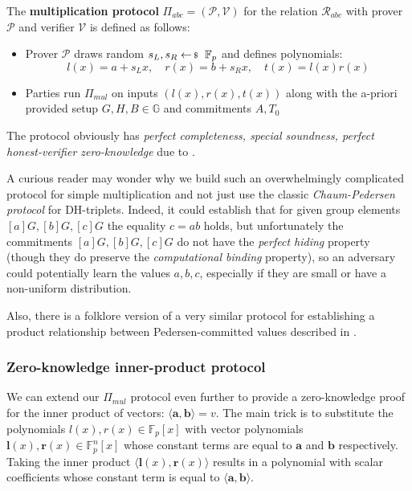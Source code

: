 \documentclass[../../book.tex]{subfiles}
\begin{document}
\begin{definition}
    The \textbf{multiplication protocol} $\Pi_{abc} = (\mathcal{P,V})$ for the relation $\mathcal{R}_{abc}$ with prover $\mathcal{P}$ and verifier $\mathcal{V}$ is defined as follows:
    \begin{itemize}
        \item Prover $\mathcal{P}$ draws random $s_L, s_R \leftarrowS \mathbb{F}_p$ and defines polynomials: $$l(x)=a+s_L x,\quad r(x)=b+s_R x,\quad t(x)=l(x)r(x)$$
        \item Parties run $\Pi_{mul}$ on inputs $(l(x),r(x),t(x))$ along with the a-priori provided setup $G,H,B \in \mathbb{G}$ and commitments $A, T_0$
    \end{itemize}
\end{definition}
The protocol obviously has \textit{perfect completeness, special soundness, perfect honest-verifier zero-knowledge} due to .

\begin{remark} %
    A curious reader may wonder why we build such an overwhelmingly complicated protocol for simple multiplication and not just use the classic \textit{Chaum-Pedersen protocol} for DH-triplets. Indeed, it could establish that for given group elements $[a]G, [b]G, [c]G$ the equality $c=ab$ holds, but unfortunately the commitments $[a]G, [b]G, [c]G$ do not have the \textit{perfect hiding} property (though they do preserve the \textit{computational binding} property), so an adversary could potentially learn the values $a,b,c$, especially if they are small or have a non-uniform distribution.
\end{remark}

Also, there is a folklore version of a very similar protocol for establishing a product relationship between Pedersen-committed values described in \cite[section 12]{thaler2022proofs}.

\subsubsection{Zero-knowledge inner-product protocol}

We can extend our $\Pi_{mul}$ protocol even further to provide a zero-knowledge proof for the inner product of vectors: $\langle \mathbf{a, b} \rangle = v$. The main trick is to substitute the polynomials $l(x), r(x) \in \mathbb{F}_p[x]$ with vector polynomials $\mathbf{l}(x), \mathbf{r}(x) \in \mathbb{F}_p^n[x]$ whose constant terms are equal to $\mathbf{a}$ and $\mathbf{b}$ respectively. Taking the inner product $\langle \mathbf{l}(x), \mathbf{r}(x) \rangle$ results in a polynomial with scalar coefficients whose constant term is equal to $\langle \mathbf{a, b} \rangle$.
\end{document}
